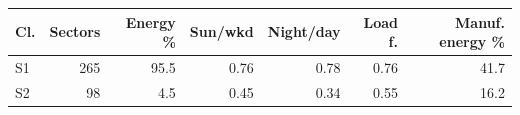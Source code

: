 \begin{tabular}{@{}lrrrrrr@{}}
\toprule
Cl. & Sectors & Energy \% & Sun/wkd & Night/day & Load f. & Manuf. energy \% \\
\midrule
S1 & 265 & 95.5 & 0.76 & 0.78 & 0.76 & 41.7 \\
S2 & 98 & 4.5 & 0.45 & 0.34 & 0.55 & 16.2 \\
\bottomrule
\end{tabular}
